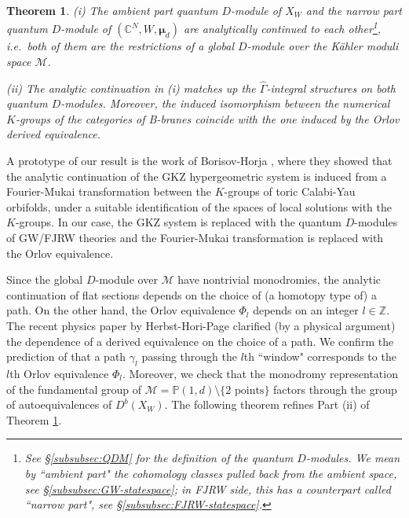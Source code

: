 \documentclass[11pt]{amsart}
\newtheorem{thm}{Theorem}[section] %
\theoremstyle{definition} %
\theoremstyle{remark} %
\newcommand{\CC}{\mathbb C}
\newcommand{\PP}{\mathbb P}
\newcommand{\ZZ}{\mathbb Z}
\newcommand{\bmu}{\boldsymbol{\mu}}
\newcommand{\cM}{\mathcal{M}}
\newcommand{\hGamma}{\widehat{\Gamma}}
\begin{document}
\begin{thm} 
\label{thm:overview_main} 
{\rm (i)} The ambient part quantum $D$-module
of $X_W$ 
and the narrow part quantum $D$-module  
of $(\CC^N, W, \bmu_d)$ are analytically continued 
to each other\footnote
{See \S \ref{subsubsec:QDM} for the definition of 
the quantum $D$-modules. We mean by ``ambient part" 
the cohomology classes pulled back from the ambient 
space, see \S \ref{subsubsec:GW-statespace}; 
in FJRW side, this has a counterpart called 
``narrow part", see \S \ref{subsubsec:FJRW-statespace}. 
}, 
i.e.\ both of them are the restrictions of a global $D$-module over the 
K\"{a}hler moduli space $\cM$.  

{\rm (ii)} The analytic continuation in {\rm (i)} 
matches up the $\hGamma$-integral structures  
on both quantum $D$-modules. 
Moreover, the induced isomorphism between the numerical $K$-groups 
of the categories of B-branes coincide with the one induced 
by the Orlov derived equivalence. 
\end{thm} 


A prototype of our result is the work of 
Borisov-Horja \cite{Borisov-Horja:FM}, where 
they showed that the analytic continuation of 
the GKZ hypergeometric system is induced from 
a Fourier-Mukai transformation between the $K$-groups 
of toric Calabi-Yau orbifolds, 
under a suitable identification of the spaces 
of local solutions with the $K$-groups. 
In our case, the GKZ system is replaced with the quantum 
$D$-modules of GW/FJRW theories and the Fourier-Mukai transformation 
is replaced with the Orlov equivalence. 

Since the global $D$-module over $\cM$ 
have nontrivial monodromies, the analytic continuation of 
flat sections depends on the choice of 
(a homotopy type of) a path. On the other hand,  
the Orlov equivalence $\Phi_l$ depends on an 
integer $l\in \ZZ$. 
The recent physics paper \cite{HHP} by Herbst-Hori-Page 
clarified (by a physical argument) 
the dependence of a derived equivalence on the choice of a path.   
We confirm the prediction of \cite{HHP} that a path $\gamma_l$ 
passing through the $l$th ``window" corresponds to 
the $l$th Orlov equivalence $\Phi_l$. 
Moreover, we check that the monodromy representation 
of the fundamental group of 
$\cM = \PP(1,d) \setminus \{\text{2 points}\}$ factors through 
the group of autoequivalences of $D^b(X_W)$. 
The following theorem refines Part (ii) of Theorem 
\ref{thm:overview_main}. 
\end{document}
